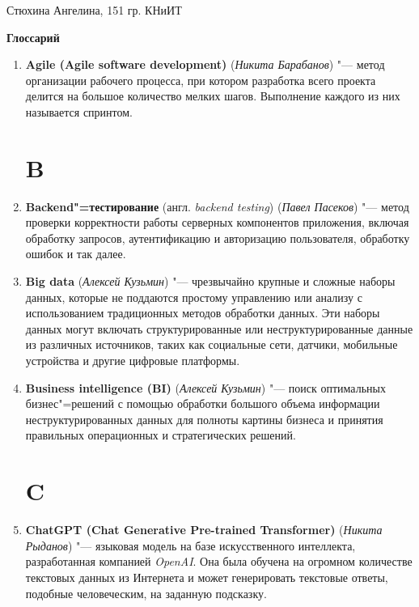 \documentclass[14pt]{extarticle}
\begin{document}
\begin{flushright}
    Стюхина Ангелина, 151 гр. КНиИТ
\end{flushright}
\begin{center}
    \Large \textbf{Глоссарий}
\end{center}
\begin{enumerate}
    \section*{A}
    \item \textbf{Agile (Agile software development)} (\textit{Никита Барабанов}) "--- метод организации рабочего процесса, при котором разработка всего проекта делится на большое количество мелких шагов. Выполнение каждого из них называется спринтом.
    \section*{B}
    \item \textbf{Backend"=тестирование} (англ. \textit{backend testing}) (\textit{Павел Пасеков}) "---
    метод проверки корректности работы серверных компонентов приложения,
    включая обработку запросов, аутентификацию и авторизацию пользователя, обработку ошибок и так далее.

    \item \textbf{Big data} (\textit{Алексей Кузьмин}) "--- чрезвычайно крупные и сложные наборы данных, которые не
    поддаются простому управлению или анализу с использованием традиционных методов обработки данных.
    Эти наборы данных могут включать структурированные или неструктурированные данные из различных
    источников, таких как социальные сети, датчики, мобильные устройства и другие цифровые платформы.

    \item \textbf{Business intelligence (BI)} (\textit{Алексей Кузьмин}) "--- поиск оптимальных бизнес"=решений с помощью обработки большого объема информации неструктурированных данных для полноты картины бизнеса и принятия правильных операционных и стратегических решений.
    \section*{C}

    \item \textbf{ChatGPT (Chat Generative Pre-trained Transformer)} (\textit{Никита Рыданов}) "--- 
    языковая модель на базе искусственного интеллекта, разработанная компанией \textit{OpenAI}. Она была обучена на
    огромном количестве текстовых данных из Интернета и может генерировать текстовые ответы, подобные
    человеческим, на заданную подсказку.

\end{enumerate}
\end{document}
